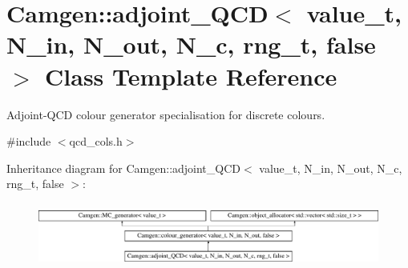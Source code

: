 \hypertarget{a00004}{}\section{Camgen\+:\+:adjoint\+\_\+\+Q\+C\+D$<$ value\+\_\+t, N\+\_\+in, N\+\_\+out, N\+\_\+c, rng\+\_\+t, false $>$ Class Template Reference}
\label{a00004}


Adjoint-\/\+Q\+C\+D colour generator specialisation for discrete colours.  




{\ttfamily \#include $<$qcd\+\_\+cols.\+h$>$}

Inheritance diagram for Camgen\+:\+:adjoint\+\_\+\+Q\+C\+D$<$ value\+\_\+t, N\+\_\+in, N\+\_\+out, N\+\_\+c, rng\+\_\+t, false $>$\+:\begin{figure}[H]
\begin{center}
\leavevmode
\includegraphics[height=2.142857cm]{a00004}
\end{center}
\end{figure}
